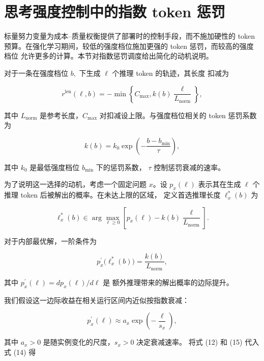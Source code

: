 \documentclass[
  10
]{article}
\begin{document}
\section{思考强度控制中的指数 token 惩罚}\label{c.-exponential-token-penalty-in-reasoning-effort-control}

标量努力变量为成本--质量权衡提供了部署时的控制手段，而不施加硬性的 token
预算。在强化学习期间，较低的强度档位施加更强的 token 惩罚，而较高的强度档位
允许更多的计算。本节对指数惩罚调度给出简化的动机说明。

对于一条在强度档位 \(b ,\) 下生成 \(\ell\) 个推理 token 的轨迹，其长度
扣减为

\[
r ^ { \mathrm { l e n } } ( \ell , b ) = - \operatorname* { m i n } \left\{ C _ { \mathrm { m a x } } , k ( b ) \frac { \ell } { L _ { \mathrm { n o r m } } } \right\} ,\tag{11}
\]

其中 \(L _ { \mathrm { n o r m } }\) 是参考长度，\(C _ { \mathrm { m a x } }\)
对扣减设上限。与强度档位相关的 token 惩罚系数为

\[
k ( b ) = k _ { 0 } \exp \left( - \frac { b - b _ { \mathrm { m i n } } } { \tau } \right) ,\tag{12}
\]

其中 \(k _ { 0 }\) 是最低强度档位 \(b _ { \mathrm { min } }\) 下的惩罚系数，
\(\tau\) 控制惩罚衰减的速率。

为了说明这一选择的动机，考虑一个固定问题 $x$。设 \(p _ { x } ( \ell )\)
表示其在生成 $\ell$ 个推理 token 后被解出的概率。在未达上限的区域，
定义首选推理长度 $\ell_x^*(b)$ 为

\[
\ell _ { x } ^ { * } ( b ) \in \arg \operatorname* { m a x } _ { \ell \geqslant 0 } \left[ p _ { x } ( \ell ) - k ( b ) \frac { \ell } { L _ { \mathrm { n o r m } } } \right] .\tag{13}
\]

对于内部最优解，一阶条件为

\[
p _ { x } ^ { \prime } \big ( \ell _ { x } ^ { * } ( b ) \big ) = \frac { k ( b ) } { L _ { \mathrm { n o r m } } } ,\tag{14}
\]

其中
\(p _ { x } ^ { \prime } ( \ell ) = d p _ { x } ( \ell ) / d \ell\) 是
额外推理带来的解出概率的边际提升。

我们假设这一边际收益在相关运行区间内近似按指数衰减：

\[
p _ { x } ^ { \prime } ( \ell ) \approx a _ { x } \exp \left( - \frac { \ell } { s _ { x } } \right) ,\tag{15}
\]

其中 \(a _ { x } > 0\) 是随实例变化的尺度，\(s _ { x } > 0\) 决定衰减速率。
将式 (12) 和 (15) 代入式 (14) 得
\end{document}
